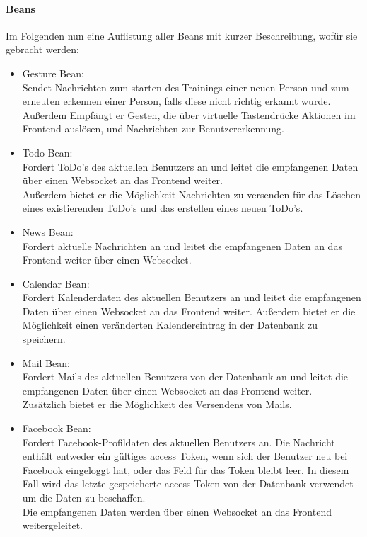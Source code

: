 \documentclass[10pt,a4paper]{report}
\begin{document}
        \paragraph{Beans}
        Im Folgenden nun eine Auflistung aller Beans mit kurzer Beschreibung,
        wofür sie gebracht werden:
        \begin{itemize}
        \item Gesture Bean: \\
            Sendet Nachrichten zum starten des Trainings
            einer neuen Person und zum erneuten erkennen einer Person, falls
            diese nicht richtig erkannt wurde. \\
            Außerdem Empfängt er Gesten, die über virtuelle Tastendrücke
            Aktionen im Frontend auslösen, und Nachrichten zur
            Benutzererkennung. \\
        \item Todo Bean: \\
            Fordert ToDo's des aktuellen Benutzers an und leitet die
            empfangenen Daten über einen Websocket an das Frontend weiter. \\
            Außerdem bietet er die Möglichkeit Nachrichten zu versenden für das
            Löschen eines existierenden ToDo's und das erstellen eines neuen
            ToDo's. \\
        \item News Bean: \\
            Fordert aktuelle Nachrichten an und leitet die empfangenen Daten an
            das Frontend weiter über einen Websocket. \\
        \item Calendar Bean: \\
            Fordert Kalenderdaten des aktuellen Benutzers an und leitet die
            empfangenen Daten über einen Websocket an das Frontend weiter.
            Außerdem bietet er die Möglichkeit einen veränderten
            Kalendereintrag in der Datenbank zu speichern. \\ 
        \item Mail Bean: \\
            Fordert Mails des aktuellen Benutzers von der Datenbank an und
            leitet die empfangenen Daten über einen Websocket an das Frontend
            weiter. \\
            Zusätzlich bietet er die Möglichkeit des Versendens von Mails. \\
        \item Facebook Bean: \\
            Fordert Facebook-Profildaten des aktuellen Benutzers an. Die
            Nachricht enthält entweder ein gültiges access Token, wenn sich der
            Benutzer neu bei Facebook eingeloggt hat, oder das Feld für das
            Token bleibt leer. In diesem Fall wird das letzte gespeicherte
            access Token von der Datenbank verwendet um die Daten zu
            beschaffen. \\
            Die empfangenen Daten werden über einen Websocket an das Frontend
            weitergeleitet. \\
        \end{itemize}
\end{document}

